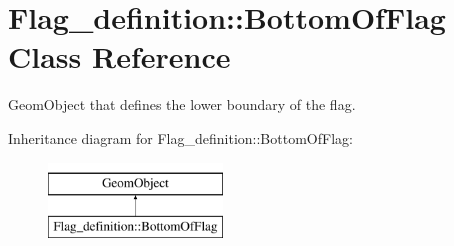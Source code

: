 \hypertarget{classFlag__definition_1_1BottomOfFlag}{}\section{Flag\+\_\+definition\+:\+:Bottom\+Of\+Flag Class Reference}
\label{classFlag__definition_1_1BottomOfFlag}


Geom\+Object that defines the lower boundary of the flag.  


Inheritance diagram for Flag\+\_\+definition\+:\+:Bottom\+Of\+Flag\+:\begin{figure}[H]
\begin{center}
\leavevmode
\includegraphics[height=2.000000cm]{classFlag__definition_1_1BottomOfFlag}
\end{center}
\end{figure}
